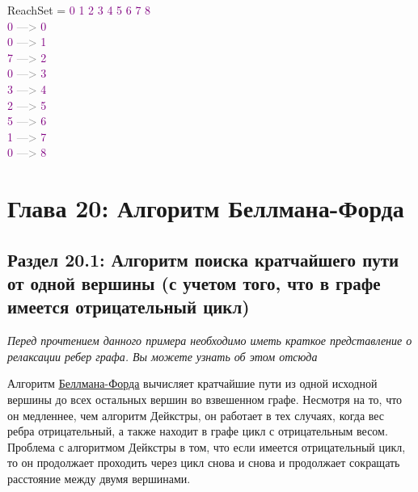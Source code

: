 \begin{tcolorbox}
{    ReachSet = \textcolor{Purple}{0 1 2 3 4 5 6 7 8} \\
    \textcolor{Purple}{0} \textcolor{Gray}{--->} \textcolor{Purple}{0} \\
    \textcolor{Purple}{0} \textcolor{Gray}{--->} \textcolor{Purple}{1} \\
    \textcolor{Purple}{7} \textcolor{Gray}{--->} \textcolor{Purple}{2} \\
    \textcolor{Purple}{0} \textcolor{Gray}{--->} \textcolor{Purple}{3} \\
    \textcolor{Purple}{3} \textcolor{Gray}{--->} \textcolor{Purple}{4} \\
    \textcolor{Purple}{2} \textcolor{Gray}{--->} \textcolor{Purple}{5} \\
    \textcolor{Purple}{5} \textcolor{Gray}{--->} \textcolor{Purple}{6} \\
    \textcolor{Purple}{1} \textcolor{Gray}{--->} \textcolor{Purple}{7} \\
    \textcolor{Purple}{0} \textcolor{Gray}{--->} \textcolor{Purple}{8} \\
    }
\end{tcolorbox}

\chapter*{Глава 20: Алгоритм Беллмана-Форда}
\section*{Раздел 20.1: Алгоритм поиска кратчайшего пути от одной вершины (с учетом того, что в графе имеется отрицательный цикл)}

\textit{Перед прочтением данного примера необходимо иметь краткое представление о релаксации ребер графа. Вы можете узнать об этом отсюда}

\vspace{\baselineskip}

Алгоритм \href{https://vk.cc/6DZOvo}{\underline{Беллмана-Форда}} вычисляет кратчайшие пути из одной исходной вершины до всех остальных вершин во взвешенном графе. Несмотря на то, что он медленнее, чем алгоритм Дейкстры, он работает в тех случаях, когда вес ребра отрицательный, а также находит в графе цикл с отрицательным весом. Проблема с алгоритмом Дейкстры в том, что если имеется отрицательный цикл, то он продолжает проходить через цикл снова и снова и продолжает сокращать расстояние между двумя вершинами.


